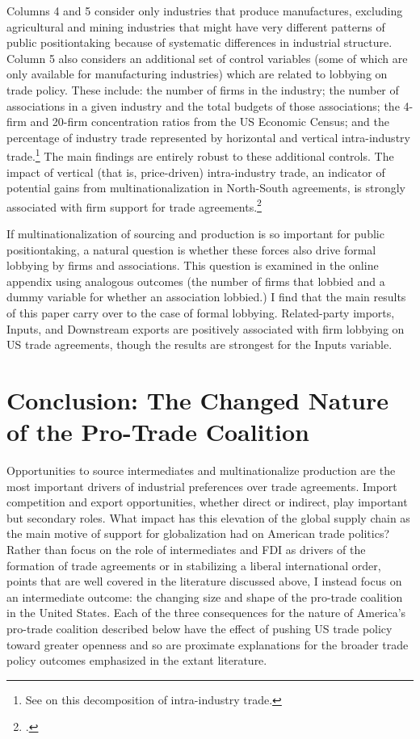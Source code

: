 \documentclass[hidelinks,12pt,letter]{article}
\begin{document}
Columns 4 and 5 consider only industries that produce manufactures, excluding agricultural and mining industries that might have very different patterns of public positiontaking because of systematic differences in industrial structure. Column 5 also considers an additional set of control variables (some of which are only available for manufacturing industries) which are related to lobbying on trade policy. These include: the number of firms in the industry; the number of associations in a given industry and the total budgets of those associations; the 4-firm and 20-firm concentration ratios from the US Economic Census; and the percentage of industry trade represented by horizontal and vertical intra-industry trade.\footnote{See \citealt{fontagne1997intra,manger2014economic} on this decomposition of intra-industry trade.} The main findings are entirely robust to these additional controls. The impact of vertical (that is, price-driven) intra-industry trade, an indicator of potential gains from multinationalization in North-South agreements, is strongly associated with firm support for trade agreements.\footnote{\citealt{manger2012vertical}.} %

If multinationalization of sourcing and production is so important for public positiontaking, a natural question is whether these forces also drive formal lobbying by firms and associations. This question is examined in the online appendix using analogous outcomes (the number of firms that lobbied and a dummy variable for whether an association lobbied.) I find that the main results of this paper carry over to the case of formal lobbying. Related-party imports, Inputs, and Downstream exports are positively associated with firm lobbying on US trade agreements, though the results are strongest for the Inputs variable. 

\section*{Conclusion: The Changed Nature of the Pro-Trade Coalition}
Opportunities to source intermediates and multinationalize production are the most important drivers of industrial preferences over trade agreements. Import competition and export opportunities, whether direct or indirect, play important but secondary roles. What impact has this elevation of the global supply chain as the main motive of support for globalization had on American trade politics? Rather than focus on the role of intermediates and FDI as drivers of the formation of trade agreements or in stabilizing a liberal international order, points that are well covered in the literature discussed above, I instead focus on an intermediate outcome: the changing size and shape of the pro-trade coalition in the United States. Each of the three consequences for the nature of America's pro-trade coalition described below have the effect of pushing US trade policy toward greater openness and so are proximate explanations for the broader trade policy outcomes emphasized in the extant literature.
\end{document}
